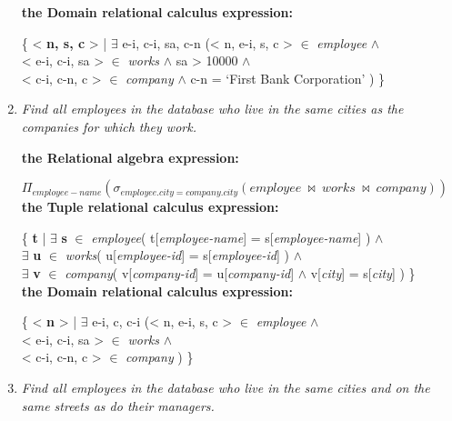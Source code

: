 \documentclass[paper=8.27in:11.69in, 14pt, DIV=calc]{scrartcl}
\begin{document}
\begin{enumerate}[label=\alph*)]
\textbf{the Domain relational calculus expression:\\}

\{ < \textbf{n, s, c} > | $\exists$ e-i, c-i, sa, c-n (< n, e-i, s, c > $\in$ \textit{employee} $\wedge$ \\ < e-i, c-i, sa > $\in$ \textit{works} $\wedge$ sa > 10000 $\wedge$ \\ < c-i, c-n, c > $\in$ \textit{company} $\wedge$ c-n = `First Bank Corporation' ) \}\\

\newpage

\item \textit{Find all employees in the database who live in the same cities as the companies for which they work.\\}

\textbf{the Relational algebra expression:\\}

$\Pi_{employee-name}(\sigma_{employee.city=company.city}(employee \ \bowtie \ works \ \bowtie \ company))$\\

\textbf{the Tuple relational calculus expression:\\}

\{ \textbf{t} | $\exists$ \textbf{s} $\in$ \textit{employee}( t[\textit{employee-name}] = s[\textit{employee-name}] ) $\wedge$ \\ $\exists$ \textbf{u} $\in$ \textit{works}( u[\textit{employee-id}] = s[\textit{employee-id}] ) $\wedge$ \\ $\exists$ \textbf{v} $\in$ \textit{company}( v[\textit{company-id}] = u[\textit{company-id}] $\wedge$ v[\textit{city}] = s[\textit{city}] ) \}\\

\textbf{the Domain relational calculus expression:\\}

\{ < \textbf{n} > | $\exists$ e-i, c, c-i (< n, e-i, s, c > $\in$ \textit{employee} $\wedge$ \\ < e-i, c-i, sa > $\in$ \textit{works} $\wedge$ \\ < c-i, c-n, c > $\in$ \textit{company} ) \}\\

\newpage

\item \textit{Find all employees in the database who live in the same cities and on the same streets as do their managers.\\}


\end{enumerate}
\end{document}
